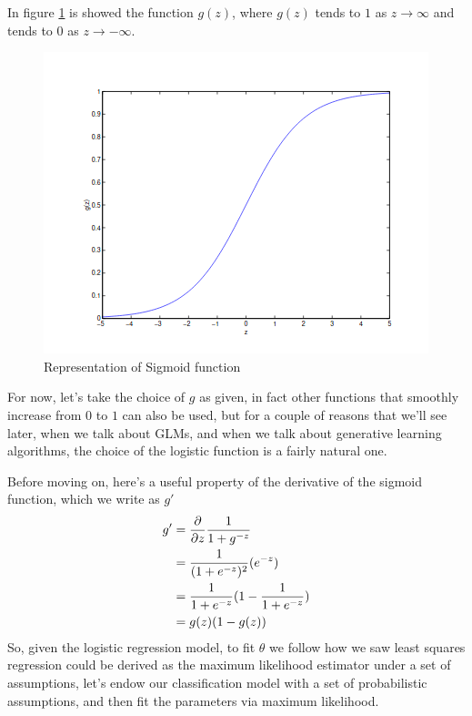 In figure \ref{img:sigmoid} is showed the function $g(z)$, where $g(z)$ tends to $1$ as $z \to \infty$ 
and tends to $0$ as $z \to -\infty$.

\begin{figure}
    \caption{Representation of Sigmoid function}
    \label{img:sigmoid}
    \includegraphics{images/sigmoid}
\end{figure}
For now, let’s take the choice of $g$ as given, in fact other functions that smoothly increase from $0$ to $1$
can also be used, but for a couple of reasons that we’ll see later, when we talk about GLMs, 
and when we talk about generative learning algorithms, the choice of the logistic function is a fairly natural one.

Before moving on, here’s a useful property of the derivative of the sigmoid function, which we write as $g'$
\begin{align*}
    g' & = \frac{\partial}{\partial z} \frac{1}{1 + g^{-z}} \\
       & = \frac{1}{(1 + e^{-z})^2} (e^{-z}) \\
       & = \frac{1}{1 + e^{-z}} (1 - \frac{1}{1 + e^{-z}}) \\
       & = g(z) (1 - g(z)) 
\end{align*}
So, given the logistic regression model, to fit $\theta$ we follow how we saw least squares regression 
could be derived as the maximum likelihood estimator under a set of assumptions, let’s endow our 
classification model with a set of probabilistic assumptions, and then fit the parameters via maximum likelihood.

